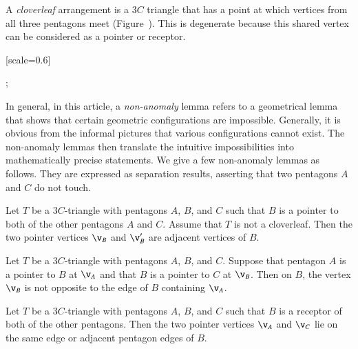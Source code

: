 

A {\it cloverleaf} arrangement is a $3C$ triangle that has a point at
which vertices from all three pentagons meet
(Figure~).  This is degenerate because this shared
vertex can be considered as a pointer or receptor.

{
[scale=0.6]
\begin{scope}[xshift=4cm]
;
\end{scope}
}

In general, in this article, a {\it non-anomaly} lemma refers to a
geometrical lemma that shows that certain geometric configurations are
impossible.  Generally, it is obvious from the informal pictures that
various configurations cannot exist.  The non-anomaly lemmas then
translate the intuitive impossibilities into mathematically precise
statements.  We give a few non-anomaly lemmas as follows.
They are expressed as separation results, asserting that
two pentagons $A$ and $C$ do not touch.

\begin{lemma} 
Let $T$ be a $3C$-triangle with pentagons $A$, $B$, and $C$ such that
$B$ is a pointer to both of the other pentagons $A$ and $C$.  
Assume that $T$ is not a cloverleaf.
Then the two pointer vertices $\v_B$ and $\v_B'$ are adjacent
vertices of $B$.
\end{lemma}

\begin{lemma}  
Let $T$ be a $3C$-triangle with pentagons $A$, $B$, and $C$.
Suppose that pentagon
$A$ is a pointer to $B$ at $\v_A$ and that $B$ is a pointer to $C$
at $\v_B$.  Then on $B$, the vertex
$\v_B$ is not opposite to the edge of $B$ containing
$\v_A$.
\end{lemma}

\begin{lemma} 
  Let $T$ be a $3C$-triangle with pentagons $A$, $B$, and $C$ such
  that $B$ is a receptor of both of the other pentagons.  Then the two
  pointer vertices $\v_A$ and $\v_C$ lie on the same edge or adjacent
  pentagon edges of $B$.
\end{lemma}



